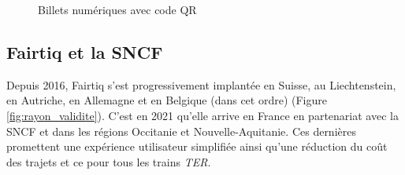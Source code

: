 \documentclass[a4paper]{article}
\begin{document}
\begin{figure}[h]
  \begin{center}
    \hspace{0.1\textwidth}
    \caption{Billets numériques avec code QR}
    \label{fig:billets_avec_qr}
  \end{center}
\end{figure}


\vspace*{1cm}

\clearpage



\subsection{Fairtiq et la SNCF}
Depuis 2016, Fairtiq s'est progressivement implantée en Suisse, au Liechtenstein,
en Autriche, en Allemagne et en Belgique (dans cet ordre) (Figure \ref*{fig:rayon_validite}).
C'est en 2021 \cite{fairtiq-fete-ses-5-ans}
qu'elle arrive en France en partenariat avec la SNCF
et dans les régions Occitanie et Nouvelle-Aquitanie. Ces dernières promettent une expérience utilisateur
simplifiée ainsi qu'une réduction du coût des trajets et ce pour tous les trains \textit{TER}.
\end{document}
